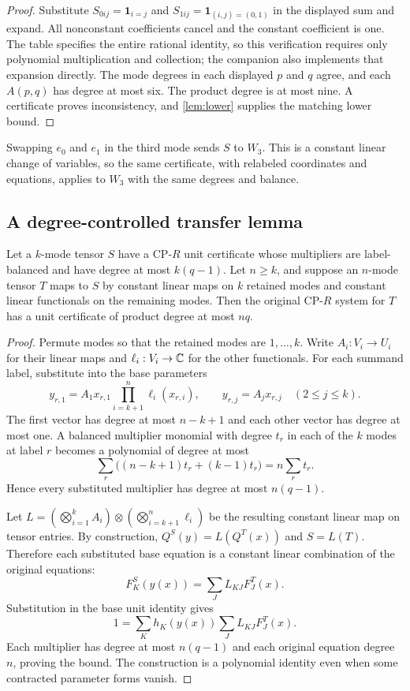 \begin{proof}
Substitute $S_{0ij}=\mathbf1_{i=j}$ and $S_{1ij}=\mathbf1_{(i,j)=(0,1)}$ in the displayed sum and expand. All nonconstant coefficients cancel and the constant coefficient is one. The table specifies the entire rational identity, so this verification requires only polynomial multiplication and collection; the companion also implements that expansion directly. The mode degrees in each displayed $p$ and $q$ agree, and each $A(p,q)$ has degree at most six. The product degree is at most nine. A certificate proves inconsistency, and \cref{lem:lower} supplies the matching lower bound.
\end{proof}

Swapping $e_0$ and $e_1$ in the third mode sends $S$ to $W_3$. This is a constant linear change of variables, so the same certificate, with relabeled coordinates and equations, applies to $W_3$ with the same degrees and balance.

\subsection{A degree-controlled transfer lemma}

\begin{lemma}\label{lem:transfer}
Let a $k$-mode tensor $S$ have a CP-$R$ unit certificate whose multipliers are label-balanced and have degree at most $k(q-1)$. Let $n\ge k$, and suppose an $n$-mode tensor $T$ maps to $S$ by constant linear maps on $k$ retained modes and constant linear functionals on the remaining modes. Then the original CP-$R$ system for $T$ has a unit certificate of product degree at most $nq$.
\end{lemma}

\begin{proof}
Permute modes so that the retained modes are $1,\ldots,k$. Write $A_i:V_i\to U_i$ for their linear maps and $\ell_i:V_i\to\mathbb{C}$ for the other functionals. For each summand label, substitute into the base parameters
\[
 y_{r,1}=A_1x_{r,1}\prod_{i=k+1}^{n}\ell_i(x_{r,i}),
 \qquad y_{r,j}=A_jx_{r,j}\quad(2\le j\le k).
\]
The first vector has degree at most $n-k+1$ and each other vector has degree at most one. A balanced multiplier monomial with degree $t_r$ in each of the $k$ modes at label $r$ becomes a polynomial of degree at most
\[
 \sum_r\bigl((n-k+1)t_r+(k-1)t_r\bigr)=n\sum_r t_r.
\]
Hence every substituted multiplier has degree at most $n(q-1)$.

Let $L=(\bigotimes_{i=1}^k A_i)\otimes(\bigotimes_{i=k+1}^n\ell_i)$ be the resulting constant linear map on tensor entries. By construction, $Q^{S}(y)=L(Q^{T}(x))$ and $S=L(T)$. Therefore each substituted base equation is a constant linear combination of the original equations:
\[
 F^S_K(y(x))=\sum_J L_{KJ}F^T_J(x).
\]
Substitution in the base unit identity gives
\[
 1=\sum_K h_K(y(x))\sum_J L_{KJ}F^T_J(x).
\]
Each multiplier has degree at most $n(q-1)$ and each original equation degree $n$, proving the bound. The construction is a polynomial identity even when some contracted parameter forms vanish.
\end{proof}

